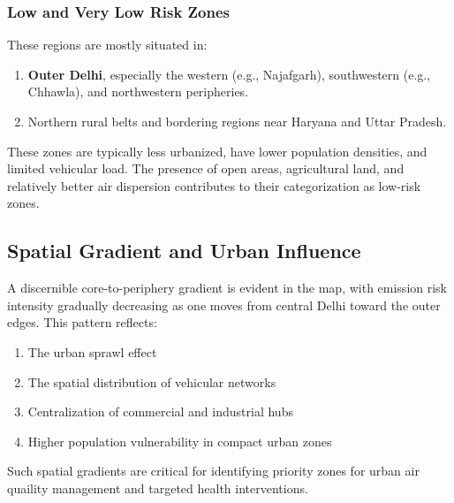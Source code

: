 \documentclass[12pt]{report}
\begin{document}
\subsubsection{Low and Very Low Risk Zones}
These regions are mostly situated in:
\begin{enumerate}
    \item \textbf{Outer Delhi}, especially the western (e.g., Najafgarh), southwestern (e.g., Chhawla), and northwestern peripheries.
    \item Northern rural belts and bordering regions near Haryana and Uttar Pradesh.
\end{enumerate}
These zones are typically less urbanized, have lower population densities, and limited vehicular load. The presence of open areas, agricultural land, and relatively better air dispersion contributes to their categorization as low-risk zones.

\subsection{Spatial Gradient and Urban Influence}
A discernible core-to-periphery gradient is evident in the map, with emission risk intensity gradually decreasing as one moves from central Delhi toward the outer edges. This pattern reflects:
\begin{enumerate}
    \item The urban sprawl effect
    \item The spatial distribution of vehicular networks
    \item Centralization of commercial and industrial hubs
    \item Higher population vulnerability in compact urban zones
\end{enumerate}
Such spatial gradients are critical for identifying priority zones for urban air quaility management and targeted health interventions.
\end{document}

